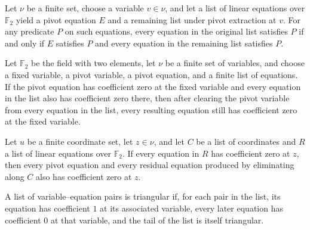 \begin{theorem}
\leanok
{}
Let $\nu$ be a finite set, choose a variable $v\in\nu$, and let a list of linear
equations over $\mathbb F_2$ yield a pivot equation $E$ and a remaining list under pivot
extraction at $v$. For any predicate $P$ on such equations, every equation in the
original list satisfies $P$ if and only if $E$ satisfies $P$ and every equation in the
remaining list satisfies $P$.
\end{theorem}

\begin{theorem}
\leanok
{}
Let $\mathbb F_2$ be the field with two elements, let $\nu$ be a finite set of
variables, and choose a fixed variable, a pivot variable, a pivot equation, and a finite
list of equations. If the pivot equation has coefficient zero at the fixed variable and
every equation in the list also has coefficient zero there, then after clearing the
pivot variable from every equation in the list, every resulting equation still has
coefficient zero at the fixed variable.
\end{theorem}

\begin{theorem}
\leanok
{}
Let $
u$ be a finite coordinate set, let $z\in\nu$, and let $C$ be a list of coordinates and
$R$ a list of linear equations over $\mathbb{F}_2$. If every equation in $R$ has
coefficient zero at $z$, then every pivot equation and every residual equation produced
by eliminating along $C$ also has coefficient zero at $z$.
\end{theorem}

\begin{definition}
\leanok
{}
A list of variable–equation pairs is triangular if, for each pair in the list, its
equation has coefficient $1$ at its associated variable, every later equation has
coefficient $0$ at that variable, and the tail of the list is itself triangular.
\end{definition}

